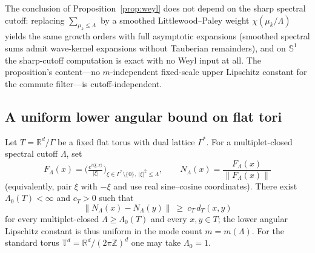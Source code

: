 \documentclass[review,supplement]{siamart220329}
\begin{document}
\begin{remark}
The conclusion of Proposition~\ref{prop:weyl} does not depend on the sharp
spectral cutoff: replacing $\sum_{\mu_k\le\Lambda}$ by a smoothed
Littlewood--Paley weight $\chi(\mu_k/\Lambda)$ yields the same growth orders with
full asymptotic expansions (smoothed spectral sums admit wave-kernel expansions
without Tauberian remainders), and on $\mathbb S^1$ the sharp-cutoff computation
is exact with no Weyl input at all. The proposition's content---no $m$-independent
fixed-scale upper Lipschitz constant for the commute filter---is
cutoff-independent.
\end{remark}

\subsection*{A uniform lower angular bound on flat tori}
\begin{proposition}
\label{prop:torus-lower-uniform}
Let $T=\mathbb R^d/\Gamma$ be a fixed flat torus with dual lattice $\Gamma^*$. For
a multiplet-closed spectral cutoff $\Lambda$, set
\[
F_\Lambda(x)=\Big(\tfrac{e^{i\langle\xi,x\rangle}}{\lvert\xi\rvert}\Big)_{\xi\in\Gamma^*\setminus\{0\},\ \lvert\xi\rvert^2\le\Lambda},
\qquad
N_\Lambda(x)=\frac{F_\Lambda(x)}{\lVert F_\Lambda(x)\rVert}
\]
(equivalently, pair $\xi$ with $-\xi$ and use real sine--cosine coordinates). There
exist $\Lambda_0(T)<\infty$ and $c_T>0$ such that
\[
\lVert N_\Lambda(x)-N_\Lambda(y)\rVert\ \ge\ c_T\,d_T(x,y)
\]
for every multiplet-closed $\Lambda\ge\Lambda_0(T)$ and every $x,y\in T$; the lower
angular Lipschitz constant is thus uniform in the mode count $m=m(\Lambda)$. For the
standard torus $\mathbb T^d=\mathbb R^d/(2\pi\mathbb Z)^d$ one may take $\Lambda_0=1$.
\end{proposition}
\end{document}
